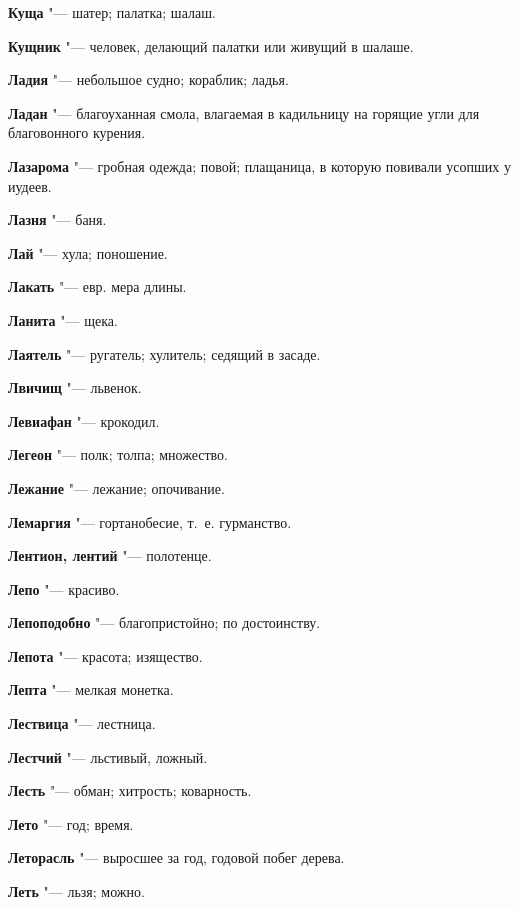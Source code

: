 \begin{mymulticols}
\noindent\textbf{Куща} "--- шатер; палатка; шалаш. 

\noindent\textbf{Кущник} "--- человек, делающий палатки или живущий в шалаше. 

\bukvaending


\noindent\textbf{Ладия} "--- небольшое судно; кораблик; ладья. 

\noindent\textbf{Ладан} "--- благоуханная смола, влагаемая в кадильницу на горящие угли для благовонного курения. 

\noindent\textbf{Лазарома} "--- гробная одежда; повой; плащаница, в которую повивали усопших у иудеев. 

\noindent\textbf{Лазня} "--- баня. 

\noindent\textbf{Лай} "--- хула; поношение. 

\noindent\textbf{Лакать} "--- евр. мера длины. 

\noindent\textbf{Ланита} "--- щека. 

\noindent\textbf{Лаятель} "--- ругатель; хулитель; седящий в засаде. 

\noindent\textbf{Лвичищ} "--- львенок. 

\noindent\textbf{Левиафан} "--- крокодил. 

\noindent\textbf{Легеон} "--- полк; толпа; множество. 

\noindent\textbf{Лежание} "--- лежание; опочивание. 

\noindent\textbf{Лемаргия} "--- гортанобесие, т.~е. гурманство. 

\noindent\textbf{Лентион, лентий} "--- полотенце. 

\noindent\textbf{Лепо} "--- красиво. 

\noindent\textbf{Лепоподобно} "--- благопристойно; по достоинству. 

\noindent\textbf{Лепота} "--- красота; изящество. 

\noindent\textbf{Лепта} "--- мелкая монетка. 

\noindent\textbf{Лествица} "--- лестница. 

\noindent\textbf{Лестчий} "--- льстивый, ложный. 

\noindent\textbf{Лесть} "--- обман; хитрость; коварность. 

\noindent\textbf{Лето} "--- год; время. 

\noindent\textbf{Леторасль} "--- выросшее за год, годовой побег дерева. 

\noindent\textbf{Леть} "--- льзя; можно. 


\end{mymulticols}
